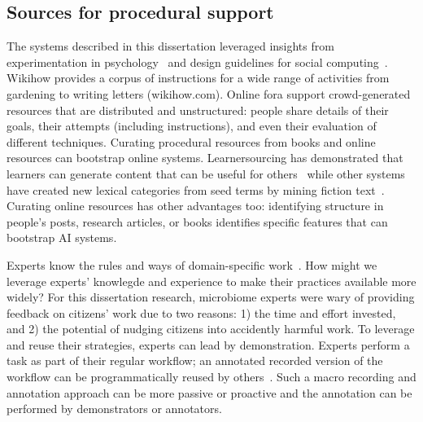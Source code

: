 \subsection{Sources for procedural support}
The systems described in this dissertation leveraged insights from experimentation in psychology~\cite{Martin2007} and design guidelines for social computing~\cite{Resnick2011}. Wikihow provides a corpus of instructions for a wide range of activities from gardening to writing letters (wikihow.com). Online fora support crowd-generated resources that are distributed and unstructured: people share details of their goals, their attempts (including instructions), and even their evaluation of different techniques. Curating procedural resources from books and online resources can bootstrap online systems. Learnersourcing has demonstrated that learners can generate content that can be useful for others~\cite{Kim2015f} while other systems have created new lexical categories from seed terms by mining fiction text~\cite{fast2016empath}. Curating online resources has other advantages too: identifying structure in people's posts, research articles, or books identifies specific features that can bootstrap AI systems.

Experts know the rules and ways of domain-specific work~\cite{Francis2006}. How might we leverage experts' knowlegde and experience to make their practices available more widely? For this dissertation research, microbiome experts were wary of providing feedback on citizens' work due to two reasons: 1) the time and effort invested, and 2) the potential of nudging citizens into accidently harmful work. To leverage and reuse their strategies, experts can lead by demonstration. Experts perform a task as part of their regular workflow; an annotated recorded version of the workflow can be programmatically reused by others~\cite{cypher1993watch}. Such a macro recording and annotation approach can be more passive or proactive and the annotation can be performed by demonstrators or annotators.




